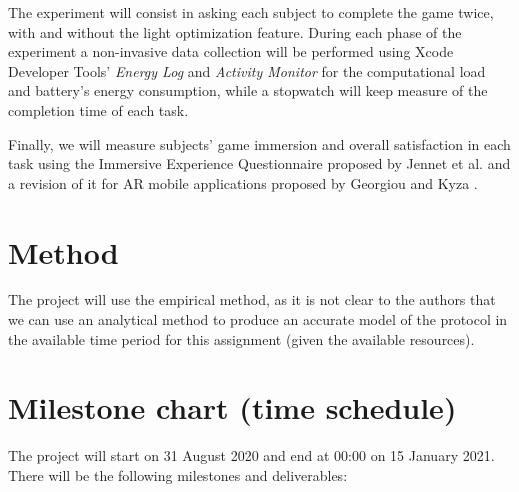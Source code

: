 \documentclass[12pt,twoside,english]{article}
\begin{document}
The experiment will consist in asking each subject to complete the game twice, with and without the light optimization feature. During each phase of the experiment a non-invasive data collection will be performed using Xcode Developer Tools' \emph{Energy Log} and \emph{Activity Monitor} for the computational load and battery's energy consumption, while a stopwatch will keep measure of the completion time of each task.

Finally, we will measure subjects' game immersion and overall satisfaction in each task using the Immersive Experience Questionnaire proposed by Jennet et al.\cite{jennett_measuring_2008} and a revision of it for AR mobile applications proposed by Georgiou and Kyza \cite{georgiou_development_2017}.

\section{Method}
\label{sect:method}

The project will use the empirical method\cite{peter_bock_getting_2001}, as it is not clear to the authors that we can use an analytical method to produce an accurate model of the protocol in the available time period for this assignment (given the available resources).

\section{Milestone chart (time schedule)}
\label{sect:milestones}

The project will start on 31 August 2020 and end at 00:00 on 15 January 2021. There will be the following milestones and deliverables:
\end{document}
